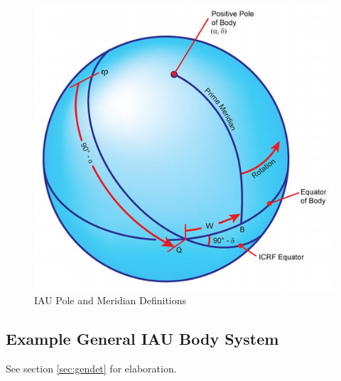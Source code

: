 \begin{figure}[htp]
\centering
\includegraphics [width=7in]{figs/fig2.png}
\caption{IAU Pole and Meridian Definitions}
\label{fig:2}
\end{figure}

\subsection{Example General IAU Body System}
See section \ref{sec:gendet} for elaboration.




